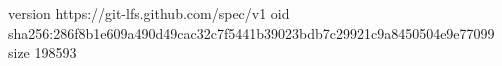 version https://git-lfs.github.com/spec/v1
oid sha256:286f8b1e609a490d49cac32c7f5441b39023bdb7c29921c9a8450504e9e77099
size 198593
